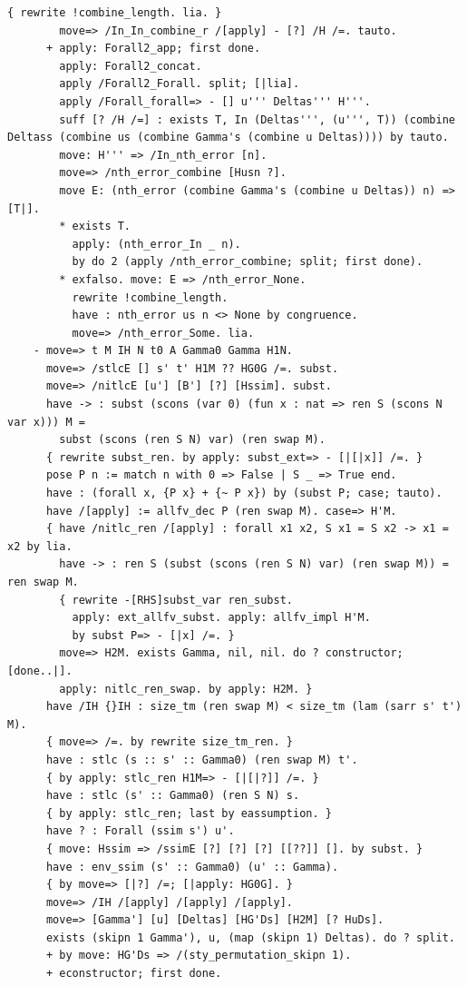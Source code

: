 \documentclass[10pt,a4paper]{article}
\begin{document}
\begin{lstlisting}[style=authorcoq]
        { rewrite !combine_length. lia. }
        move=> /In_In_combine_r /[apply] - [?] /H /=. tauto.
      + apply: Forall2_app; first done.
        apply: Forall2_concat.
        apply /Forall2_Forall. split; [|lia].
        apply /Forall_forall=> - [] u''' Deltas''' H'''.
        suff [? /H /=] : exists T, In (Deltas''', (u''', T)) (combine Deltass (combine us (combine Gamma's (combine u Deltas)))) by tauto.
        move: H''' => /In_nth_error [n].
        move=> /nth_error_combine [Husn ?].
        move E: (nth_error (combine Gamma's (combine u Deltas)) n) => [T|].
        * exists T.
          apply: (nth_error_In _ n).
          by do 2 (apply /nth_error_combine; split; first done).
        * exfalso. move: E => /nth_error_None.
          rewrite !combine_length.
          have : nth_error us n <> None by congruence.
          move=> /nth_error_Some. lia.
    - move=> t M IH N t0 A Gamma0 Gamma H1N.
      move=> /stlcE [] s' t' H1M ?? HG0G /=. subst.
      move=> /nitlcE [u'] [B'] [?] [Hssim]. subst.
      have -> : subst (scons (var 0) (fun x : nat => ren S (scons N var x))) M = 
        subst (scons (ren S N) var) (ren swap M).
      { rewrite subst_ren. by apply: subst_ext=> - [|[|x]] /=. }
      pose P n := match n with 0 => False | S _ => True end.
      have : (forall x, {P x} + {~ P x}) by (subst P; case; tauto).
      have /[apply] := allfv_dec P (ren swap M). case=> H'M.
      { have /nitlc_ren /[apply] : forall x1 x2, S x1 = S x2 -> x1 = x2 by lia.
        have -> : ren S (subst (scons (ren S N) var) (ren swap M)) = ren swap M.
        { rewrite -[RHS]subst_var ren_subst.
          apply: ext_allfv_subst. apply: allfv_impl H'M.
          by subst P=> - [|x] /=. }
        move=> H2M. exists Gamma, nil, nil. do ? constructor; [done..|].
        apply: nitlc_ren_swap. by apply: H2M. }
      have /IH {}IH : size_tm (ren swap M) < size_tm (lam (sarr s' t') M).
      { move=> /=. by rewrite size_tm_ren. }
      have : stlc (s :: s' :: Gamma0) (ren swap M) t'.
      { by apply: stlc_ren H1M=> - [|[|?]] /=. }
      have : stlc (s' :: Gamma0) (ren S N) s.
      { by apply: stlc_ren; last by eassumption. }
      have ? : Forall (ssim s') u'.
      { move: Hssim => /ssimE [?] [?] [?] [[??]] []. by subst. }
      have : env_ssim (s' :: Gamma0) (u' :: Gamma).
      { by move=> [|?] /=; [|apply: HG0G]. }
      move=> /IH /[apply] /[apply] /[apply].
      move=> [Gamma'] [u] [Deltas] [HG'Ds] [H2M] [? HuDs].
      exists (skipn 1 Gamma'), u, (map (skipn 1) Deltas). do ? split.
      + by move: HG'Ds => /(sty_permutation_skipn 1).
      + econstructor; first done.

\end{lstlisting}
\end{document}
